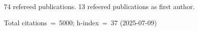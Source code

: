 74 refereed publications. 13 refeered publications as first author.

Total citations~=~5000; h-index~=~37 (2025-07-09)